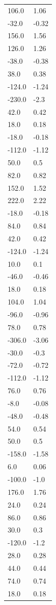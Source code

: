 \begin{longtable}{ll}
106.0 & 1.06 \\
-32.0 & -0.32 \\
156.0 & 1.56 \\
126.0 & 1.26 \\
-38.0 & -0.38 \\
38.0 & 0.38 \\
-124.0 & -1.24 \\
-230.0 & -2.3 \\
42.0 & 0.42 \\
18.0 & 0.18 \\
-18.0 & -0.18 \\
-112.0 & -1.12 \\
50.0 & 0.5 \\
82.0 & 0.82 \\
152.0 & 1.52 \\
222.0 & 2.22 \\
-18.0 & -0.18 \\
84.0 & 0.84 \\
42.0 & 0.42 \\
-124.0 & -1.24 \\
10.0 & 0.1 \\
-46.0 & -0.46 \\
18.0 & 0.18 \\
104.0 & 1.04 \\
-96.0 & -0.96 \\
78.0 & 0.78 \\
-306.0 & -3.06 \\
-30.0 & -0.3 \\
-72.0 & -0.72 \\
-112.0 & -1.12 \\
76.0 & 0.76 \\
-8.0 & -0.08 \\
-48.0 & -0.48 \\
54.0 & 0.54 \\
50.0 & 0.5 \\
-158.0 & -1.58 \\
6.0 & 0.06 \\
-100.0 & -1.0 \\
176.0 & 1.76 \\
24.0 & 0.24 \\
86.0 & 0.86 \\
30.0 & 0.3 \\
-120.0 & -1.2 \\
28.0 & 0.28 \\
44.0 & 0.44 \\
74.0 & 0.74 \\
18.0 & 0.18 \\

\end{longtable}
